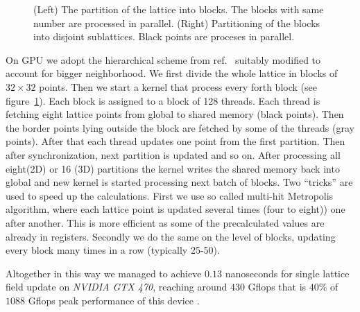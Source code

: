 \documentclass[a4paper]{llncs}
\begin{document}
\begin{figure}
\begin{center}
\end{center}
\caption{\label{fig:nn} (Left) The partition of the lattice into
  blocks. The blocks with same number are processed in parallel.
  (Right) Partitioning of the blocks into disjoint sublattices. Black
  points are proceses in parallel.}
\end{figure}


On GPU we adopt the hierarchical scheme from ref.~\cite{weigel}
suitably modified to account for bigger neighborhood.  We first divide
the whole lattice in blocks of $32\times 32$ points. Then we start a
kernel that process every forth block (see figure~\ref{fig:nn}).  Each
block is assigned to a block of 128 threads. Each thread is fetching
eight lattice points from global to shared memory (black points). Then
the border points lying outside the block are fetched by some of the
threads (gray points).  After that each thread updates
one point from the first partition. Then after synchronization, next
partition is updated and so on. After processing all eight(2D) or 16
(3D) partitions the kernel writes the shared memory back into global
and new kernel is started processing next batch of blocks.  Two
``tricks'' are used to speed up the calculations. First we use so
called multi-hit Metropolis algorithm, where each lattice point is
updated several times (four to eight)) one after another. This is more
efficient as some of the precalculated values are already in
registers. Secondly we do the same on the level of blocks, updating
every block many times in a row (typically 25-50). 

Altogether in this
way we managed to achieve $0.13$ nanoseconds for single lattice field
update on \emph{NVIDIA GTX 470}, reaching around $430$ Gflops that is
$40\%$ of $1088$ Gflops peak performance of this device .
\end{document}
